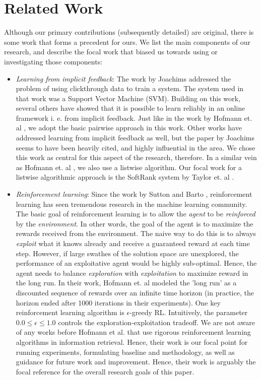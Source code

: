 \documentclass{acm_proc_article-sp}
\begin{document}
\section{Related Work}
Although our primary contributions (subsequently detailed) are original, there is some work that forms a precedent for ours. We list the main components of our research, and describe the focal work that biased us towards using or investigating those components:
\begin{itemize}
\item \emph{Learning from implicit feedback}: The work by Joachims \cite{joachims} addressed the problem of using clickthrough data to train a system. The system used in that work was a Support Vector Machine (SVM). Building on this work, several others have showed that it is possible to learn reliably in an online framework i. e. from implicit feedback. Just like in the work by Hofmann et. al \cite{hofmann}, we adopt the basic pairwise approach in this work. Other works have addressed learning from implicit feedback as well, but the paper by Joachims \cite{joachims} seems to have been heavily cited, and highly influential in the area. We chose this work as central for this aspect of the research, therefore. In a similar vein as Hofmann et. al \cite{hofmann}, we also use a listwise algorithm. Our focal work for a listwise algorithmic approach is the SoftRank system by Taylor et. al \cite{taylor}. 
\item \emph{Reinforcement learning}: Since the work by Sutton and Barto \cite{rl}, reinforcement learning has seen tremendous research in the machine learning community. The basic goal of reinforcement learning is to allow the \emph{agent} to be \emph{reinforced} by the \emph{environment}. In other words, the goal of the agent is to maximize the rewards received from the environment. The naive way to do this is to always \emph{exploit} what it knows already and receive a guaranteed reward at each time step. However, if large swathes of the solution space are unexplored, the performance of an exploitative agent would be highly sub-optimal. Hence, the agent needs to balance \emph{exploration} with \emph{exploitation} to maximize reward in the long run. In their work, Hofmann et. al modeled the 'long run' as a discounted sequence of rewards over an infinite time horizon (in practice, the horizon ended after 1000 iterations in their experiments). One key reinforcement learning algorithm is $\epsilon$-greedy RL. Intuitively, the parameter $0.0 \leq \epsilon \leq 1.0$ controls the exploration-exploitation tradeoff. We are not aware of any works before Hofmann et al. \cite{hofmann} that use rigorous reinforcement learning algorithms in information retrieval. Hence, their work is our focal point for running experiments, formulating baseline and methodology, as well as guidance for future work and improvement. Hence, their work is arguably the focal reference for the overall research goals of this paper.

\end{itemize}
\end{document}
